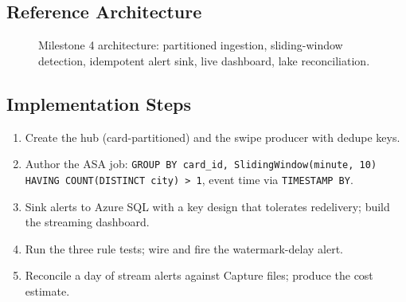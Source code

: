 \subsection*{Reference Architecture}
\begin{figure}[H]
    \centering
    \caption{Milestone 4 architecture: partitioned ingestion, sliding-window detection, idempotent alert sink, live dashboard, lake reconciliation.}
    \label{fig:ch16-capstone-arch}
\end{figure}

\subsection*{Implementation Steps}
\begin{enumerate}
    \item Create the hub (card-partitioned) and the swipe producer with dedupe keys.
    \item Author the ASA job: \texttt{GROUP BY card\_id, SlidingWindow(minute, 10) HAVING COUNT(DISTINCT city) > 1}, event time via \texttt{TIMESTAMP BY}.
    \item Sink alerts to Azure SQL with a key design that tolerates redelivery; build the streaming dashboard.
    \item Run the three rule tests; wire and fire the watermark-delay alert.
    \item Reconcile a day of stream alerts against Capture files; produce the cost estimate.
\end{enumerate}


